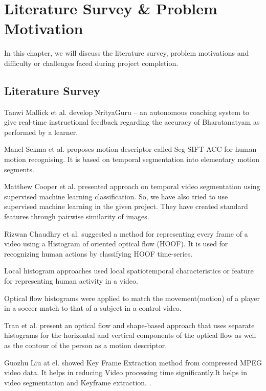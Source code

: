 
\chapter{Literature Survey \& Problem Motivation} %

\label{Chapter 2} 

In this chapter, we will discuss the literature survey, problem motivations and difficulty or challenges faced during project completion.


\section{Literature Survey}
Tanwi Mallick et al. develop NrityaGuru – an autonomous coaching system to give real-time instructional feedback regarding the accuracy of Bharatanatyam as performed by a learner.

Manel Sekma et al. proposes motion descriptor called Seg SIFT-ACC for human motion recognising. It is based on temporal segmentation into elementary motion segments. \citep{sekma2013human}

Matthew Cooper et al. presented approach on temporal video segmentation using supervised machine learning classification. So, we have also tried to use supervised machine learning in the given project.
They have created standard features through pairwise similarity of images. \citep{cooper2007video}

Rizwan Chaudhry et al. suggested a method for representing every frame of a video using a Histogram of oriented optical flow (HOOF). It is used for recognizing human actions by classifying HOOF time-series. \citep{chaudhry2009histograms}

Local histogram approaches used local spatiotemporal characteristics or feature for representing human activity in a video. \citep{laptev2005space}

Optical flow histograms were applied to match the movement(motion) of a player in a soccer match to that of a subject in a control video.  \citep{efros2003recognizing}

Tran et al. present an optical flow and shape-based approach that uses separate histograms for the horizontal and vertical components of the optical flow as well as the contour of the person as a motion descriptor. \citep{tran2008human}

Guozhu Liu at el. showed Key Frame Extraction method from compressed MPEG  video data. It helps in reducing Video processing time significantly.It helps in video segmentation and Keyframe extraction. \citep{liu2010key}.

